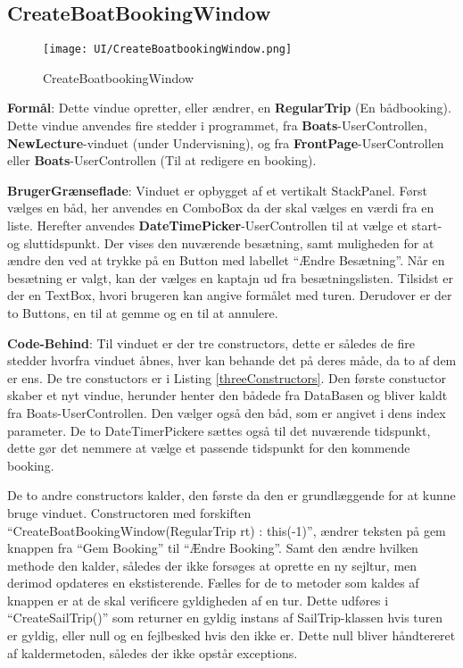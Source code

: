 \subsection{CreateBoatBookingWindow}

\begin{wrapfigure}{R}{0.5\textwidth}
    \label{img:boatBookWindow}
    \vspace{-20pt}
    \begin{center}
        \texttt{[image: UI/CreateBoatbookingWindow.png]}
    \end{center}
    \vspace{-20pt}
    \caption{CreateBoatbookingWindow}
    \vspace{-30pt}
\end{wrapfigure}

\textbf{Formål}: 
Dette vindue opretter, eller ændrer, en \textbf{RegularTrip} (En bådbooking).
Dette vindue anvendes fire stedder i programmet, fra \textbf{Boats}-UserControllen, \textbf{NewLecture}-vinduet (under Undervisning), og fra \textbf{FrontPage}-UserControllen eller \textbf{Boats}-UserControllen (Til at redigere en booking). 

\textbf{BrugerGrænseflade}: 
Vinduet er opbygget af et vertikalt StackPanel.
Først vælges en båd, her anvendes en ComboBox da der skal vælges en værdi fra en liste.
Herefter anvendes \textbf{DateTimePicker}-UserControllen til at vælge et start- og sluttidspunkt.
Der vises den nuværende besætning, samt muligheden for at ændre den ved at trykke på en Button med labellet ``Ændre Besætning''.
Når en besætning er valgt, kan der vælges en kaptajn ud fra besætningslisten.
Tilsidst er der en TextBox, hvori brugeren kan angive formålet med turen.
Derudover er der to Buttons, en til at gemme og en til at annulere.

\textbf{Code-Behind}: 
Til vinduet er der tre constructors, dette er således de fire stedder hvorfra vinduet åbnes, hver kan behande det på deres måde, da to af dem er ens. 
De tre constuctors er i Listing \ref{threeConstructors}.
Den første constuctor skaber et nyt vindue, herunder henter den bådede fra DataBasen og bliver kaldt fra Boats-UserControllen.
Den vælger også den båd, som er angivet i dens index parameter.
De to DateTimerPickere sættes også til det nuværende tidspunkt, dette gør det nemmere at vælge et passende tidspunkt for den kommende booking.

De to andre constructors kalder, den første da den er grundlæggende for at kunne bruge vinduet. 
Constructoren med forskiften ``CreateBoatBookingWindow(RegularTrip rt) : this(-1)'', ændrer teksten på gem knappen fra ``Gem Booking'' til ``Ændre Booking''. 
Samt den ændre hvilken methode den kalder, således der ikke forsøges at oprette en ny sejltur, men derimod opdateres en ekstisterende. 
Fælles for de to metoder som kaldes af knappen er at de skal verificere gyldigheden af en tur. 
Dette udføres i ``CreateSailTrip()'' som returner en gyldig instans af SailTrip-klassen hvis turen er gyldig, eller null og en fejlbesked hvis den ikke er. 
Dette null bliver håndtereret af kaldermetoden, således der ikke opstår exceptions.

